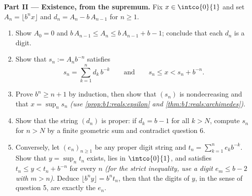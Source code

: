 \begin{problem}
\medskip
\noindent\textbf{Part II --- Existence, from the supremum.} Fix
$x \in \intco{0}{1}$ and set $A_n = \lfloor b^n x \rfloor$ and
$d_n = A_n - b\,A_{n-1}$ for $n \geq 1$.
\begin{enumerate}[resume]
  \item Show $A_0 = 0$ and $b\,A_{n-1} \leq A_n \leq b\,A_{n-1} +
        b - 1$; conclude that each $d_n$ is a digit.
  \item Show that $s_n := A_n b^{-n}$ satisfies
        \[
        s_n = \sum_{k=1}^{n} d_k\,b^{-k}
        \qquad\text{and}\qquad
        s_n \leq x < s_n + b^{-n} .
        \]
  \item Prove $b^n \geq n + 1$ by induction, then show that
        $(s_n)$ is nondecreasing and that $x = \sup_n s_n$
        \emph{(use \cref{prop:b1:reals:epsilon} and
        \cref{thm:b1:reals:archimedes})}.
  \item Show that the string $(d_n)$ is proper: if $d_k = b - 1$
        for all $k > N$, compute $s_n$ for $n > N$ by a finite
        geometric sum and contradict question 6.
  \item Conversely, let $(e_n)_{n \geq 1}$ be any proper digit
        string and $t_n = \sum_{k=1}^n e_k b^{-k}$. Show that $y
        = \sup_n t_n$ exists, lies in $\intco{0}{1}$, and
        satisfies $t_n \leq y < t_n + b^{-n}$ for every $n$
        \emph{(for the strict inequality, use a digit $e_m \leq b
        - 2$ with $m > n$)}. Deduce $\lfloor b^n y \rfloor = b^n
        t_n$, then that the digits of $y$, in the sense of
        question 5, are exactly the $e_n$.
\end{enumerate}


\end{problem}
